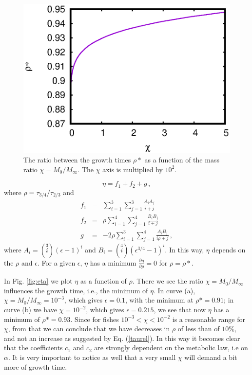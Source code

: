 \documentclass[12pt]{iopart}
\begin{document}
\begin{figure}%
\centering
\includegraphics[width=.8\columnwidth]{figure_2}%
\caption{ The ratio between the growth times $\rho*$ as a function of the mass ratio $\chi=M_0/M_\infty$.  The $\chi$ axis is multiplied by $10^2$. }
\label{fig:rho}
\end{figure}


\begin{equation}
\eta  = f_1 + f_2 + g\,,
\end{equation}
where $\rho=\tau_{3/4}/\tau_{2/3}$ and
\begin{eqnarray}
f_{1}&=&\sum_{i = 1}^3\sum_{j = 1}^3 \frac{A_{i}A_{j}}{i+j}\\
f_{2}&=&\rho\sum_{i = 1}^4\sum_{j = 1}^4 \frac{B_{i}B_{j}}{i+j}\\
g&=&-2\rho\sum_{i = 1}^3\sum_{j = 1}^4 \frac{A_{i}B_{j}}{i\rho+j}\,,
\end{eqnarray}
where $A_i=\left(\stackrel{3}{i}\right)(\epsilon -1)^{i}$ and $B_i=\left(\stackrel{4}{i}\right)(\epsilon^{3/4} -1)^{i}$. In this way, $\eta$ depends on the $\rho$ and $\epsilon$. For a given $\epsilon$, $\eta$ has a minimum $\frac{\partial \eta}{\partial \rho}=0$ for $\rho=\rho*$.

In  Fig. \ref{fig:eta} we plot $\eta$ as a function of $\rho$. There we see the ratio  $\chi=M_0/M_{\infty}$ influences the growth time, i.e., the minimum of $\eta$.  In curve (a), $\chi=M_0/M_{\infty}=10^{-3}$, which gives $\epsilon = 0.1$, with the minimum at $\rho*=0.91$; in curve (b) we have $\chi=10^{-2}$, which gives $\epsilon=0.215$, we see that now $\eta$ has a minimum of $\rho* = 0.93$. Since for fishes  $10^{-3} < \chi < 10^{-2}$ is a reasonable range for $\chi$, from that we can conclude that we have decreases in $\rho$ of less than of $10\%$, and not an increase as suggested by Eq. (\ref{taurel}).  In this way it becomes clear that the coefficients $c_1$ and $c_2$ are strongly dependent on the metabolic law, i.e on  $\alpha$.
It is very important to notice as well that a very small $\chi$ will demand a bit more of  growth time.
\end{document}
